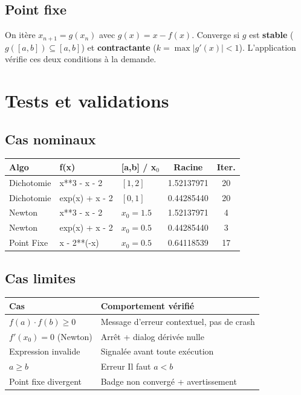 \documentclass[11pt,a4paper]{article}
\begin{document}
\subsection{Point fixe}

On itère $x_{n+1}=g(x_n)$ avec $g(x)=x-f(x)$. Converge si $g$ est
\textbf{stable} ($g([a,b])\subseteq[a,b]$) et \textbf{contractante}
($k=\max|g'(x)|<1$). L'application vérifie ces deux conditions à la demande.

\section{Tests et validations}

\subsection{Cas nominaux}

\renewcommand{\arraystretch}{1.25}
\begin{tabularx}{\linewidth}{l >{\ttfamily}l l c c}
\toprule
\textbf{Algo} & \normalfont\textbf{f(x)} & \textbf{[a,b] / x$_0$}
  & \textbf{Racine} & \textbf{Iter.} \\
\midrule
Dichotomie  & x**3 - x - 2    & $[1,2]$    & 1.52137971 & 20 \\
Dichotomie  & exp(x) + x - 2  & $[0,1]$    & 0.44285440 & 20 \\
Newton      & x**3 - x - 2    & $x_0=1.5$  & 1.52137971 &  4 \\
Newton      & exp(x) + x - 2  & $x_0=0.5$  & 0.44285440 &  3 \\
Point Fixe  & x - 2**(-x)     & $x_0=0.5$  & 0.64118539 & 17 \\
\bottomrule
\end{tabularx}

\vspace{4pt}

\subsection{Cas limites}

\begin{tcolorbox}[info]
\renewcommand{\arraystretch}{1.15}
\begin{tabularx}{\linewidth}{l X}
\textbf{Cas} & \textbf{Comportement vérifié} \\
\hline
$f(a)\cdot f(b)\geq 0$ & Message d'erreur contextuel, pas de crash \\
$f'(x_0)=0$ (Newton)   & Arrêt + dialog \og{}dérivée nulle\fg{} \\
Expression invalide     & Signalée avant toute exécution \\
$a\geq b$               & Erreur \og{}Il faut $a<b$\fg{} \\
Point fixe divergent    & Badge \og{}non convergé\fg{} + avertissement \\
\end{tabularx}
\end{tcolorbox}
\end{document}
